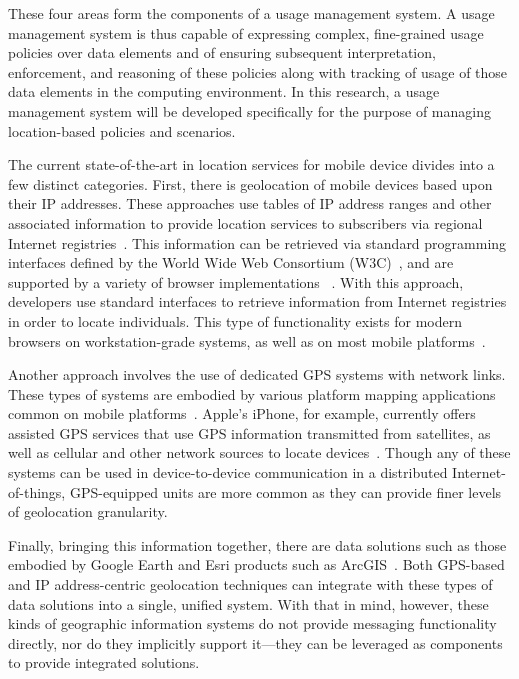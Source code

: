 \documentclass{sbir}
\begin{document}
These four areas form the components of a usage management system. A usage management system is thus capable of expressing complex, fine-grained usage policies over data elements and of ensuring subsequent interpretation, enforcement, and reasoning of these policies along with tracking of usage of those data elements in the computing environment. In this research, a usage management system will be developed specifically for the purpose of managing location-based policies and scenarios. 

The current state-of-the-art in location services for mobile device divides into a few distinct categories. First, there is geolocation of mobile devices based upon their IP addresses. These approaches use tables of IP address ranges and other associated information to provide location services to subscribers via regional Internet registries~\cite{AIRN:13,RIPE:13}. This information can be retrieved via standard programming interfaces defined by the World Wide Web Consortium (W3C)~\cite{w3c:13}, and are supported by a variety of browser implementations ~\cite{firefox:13,Pi:13}. With this approach, developers use standard interfaces to retrieve information from Internet registries in order to locate individuals. This type of functionality exists for modern browsers on workstation-grade systems, as well as on most mobile platforms~\cite{opera:13,safari:13}.

Another approach involves the use of dedicated GPS systems with network links. These types of systems are embodied by various platform mapping applications common on mobile platforms~\cite{amap:13,gmap:13}. Apple's iPhone, for example, currently offers assisted GPS services that use GPS information transmitted from satellites, as well as cellular and other network sources to locate devices~\cite{amap:13}. Though any of these systems can be used in device-to-device communication in a distributed Internet-of-things, GPS-equipped units are more common as they can provide finer levels of geolocation granularity.

Finally, bringing this information together, there are data solutions such as those embodied by Google Earth and Esri %
products such as ArcGIS~\cite{esri:13,gearth:13}. Both GPS-based and IP address-centric geolocation techniques can integrate with these types of data solutions into a single, unified system. With that in mind, however, these kinds of geographic information systems do not provide messaging functionality directly, nor do they implicitly support it---they can be leveraged as components to provide integrated solutions.
\end{document}
